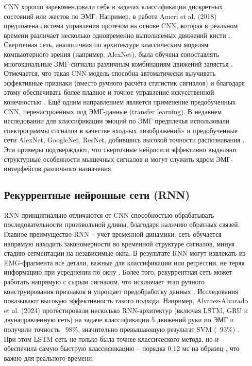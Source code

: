\documentclass[12pt,a4paper]{article}
\begin{document}
CNN хорошо зарекомендовали себя в задачах классификации дискретных состояний или жестов по ЭМГ. Например, в работе Ameri et al. (2018) предложена система управления протезом на основе CNN, которая в реальном времени различает несколько одновременно выполняемых движений кисти \cite{15}. Сверточная сеть, аналогичная по архитектуре классическим моделям компьютерного зрения (например, AlexNet), была обучена сопоставлять многоканальные ЭМГ-сигналы различным комбинациям движений запястья \cite{16}. Отмечается, что такая CNN-модель способна автоматически выучивать эффективные признаки (вместо ручного расчёта статистик сигналов) и благодаря этому обеспечивать более плавное и точное управление искусственной конечностью \cite{15}. Ещё одним направлением является применение предобученных CNN, перенастроенных под ЭМГ-данные (transfer learning). В недавнем исследовании для классификации эмоций по ЭМГ предплечья использовали спектрограммы сигналов в качестве входных «изображений» и предобученные сети AlexNet, GoogleNet, ResNet, добившись высокой точности распознавания \cite{17}. Эти примеры подтверждают, что сверточные нейросети эффективно выделяют структурные особенности мышечных сигналов и могут служить ядром ЭМГ-интерфейсов различного назначения.



\subsection{Рекуррентные нейронные сети (RNN)}
 RNN принципиально отличаются от CNN способностью обрабатывать последовательности произвольной длины, благодаря наличию обратных связей. Главное преимущество RNN – учёт временной динамики: сеть обучается напрямую находить закономерности во временной структуре сигналов, минуя стадию сегментации на независимые окна. В результате RNN могут извлекать из EMG-фрагмента все детали, важные для классификации или регрессии, не теряя информацию при усреднении по окну \cite{18}. Более того, рекуррентная сеть может работать напрямую с сырым сигналом, что исключает этап ручного конструирования признаков и упрощает предобработку данных \cite{19}. Исследования показывают высокую эффективность такого подхода. Например, Alvarez-Alvarado et al. (2024) протестировали несколько RNN-архитектур (включая LSTM, GRU и двунаправленную сеть) на задаче классификации 5 движений руки по ЭМГ и получили точность ~98\%, значительно превышающую результат SVM (~93\%) \cite{20}. При этом LSTM-сеть не только была точнее классического метода, но и обеспечила самую быструю классификацию – порядка 0.12 мс на образец \cite{20}, что важно для реального времени.
\end{document}
